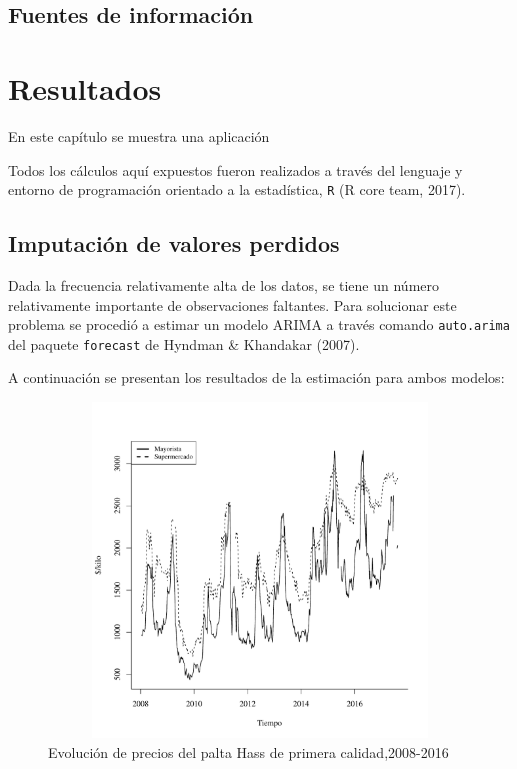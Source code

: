 \documentclass[12pt, twoside]{book}\usepackage[]{graphicx}\usepackage[]{color}
\newenvironment{knitrout}{}{} %
\numberwithin{equation}{section}
\numberwithin{theorem}{section}
\numberwithin{teorema}{section}
\numberwithin{defi}{section}
\numberwithin{prop}{section}
\numberwithin{defi}{section}
\theoremstyle{plain}
\begin{document}
\section{Fuentes de información}




\chapter{Resultados}

En este capítulo se muestra una aplicación

Todos los cálculos aquí expuestos fueron realizados a través del lenguaje y entorno de programación orientado a la estadística, \texttt{R} (R core team, 2017).

\section{Imputación de valores perdidos}





Dada la frecuencia relativamente alta de los datos, se tiene un número relativamente importante de observaciones faltantes. Para solucionar este problema se procedió a estimar un modelo ARIMA a través comando \texttt{auto.arima} del paquete \texttt{forecast} de Hyndman \& Khandakar (2007).



A continuación se presentan los resultados de la estimación para ambos modelos: 


\begin{knitrout}
\color{fgcolor}\begin{figure}[H]

{\centering \includegraphics[width=6.5in,height=3.5in]{figure/fig-1-1} 

}

\caption[Evolución de precios del palta Hass de primera calidad,2008-2016]{Evolución de precios del palta Hass de primera calidad,2008-2016}\label{fig:fig-1}
\end{figure}


\end{knitrout}
\end{document}
